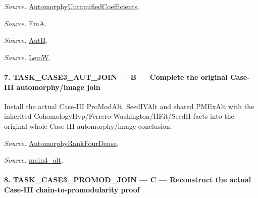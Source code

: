 \emph{Source.} \href{https://github.com/CocoSgt/riemann-hypothesis-lean/blob/7cbf7a0c32fca1badf05931879a37c3f8a2b03b4/src/Development/AutomorphicArithmetic/AutomorphicVarieties/AutomorphicCases/AutomorphyUnramifiedCoefficients.lean#L24-L27}{AutomorphyUnramifiedCoefficients}.

\emph{Source.} \href{https://github.com/CocoSgt/riemann-hypothesis-lean/blob/7cbf7a0c32fca1badf05931879a37c3f8a2b03b4/src/Development/AutomorphicArithmetic/AutomorphicVarieties/AutomorphicCases/AutomorphyUnramifiedCoefficients.lean#L12-L13}{FinA}.

\emph{Source.} \href{https://github.com/CocoSgt/riemann-hypothesis-lean/blob/7cbf7a0c32fca1badf05931879a37c3f8a2b03b4/src/Development/AutomorphicArithmetic/AutomorphicVarieties/AutomorphicCases/AutomorphyUnramifiedCoefficients.lean#L15-L17}{AutB}.

\emph{Source.} \href{https://github.com/CocoSgt/riemann-hypothesis-lean/blob/7cbf7a0c32fca1badf05931879a37c3f8a2b03b4/src/Development/AutomorphicArithmetic/AutomorphicVarieties/AutomorphicCases/AutomorphyUnramifiedCoefficients.lean#L19-L22}{LemW}.



\paragraph{7. TASK\_\allowbreak CASE3\_\allowbreak AUT\_\allowbreak JOIN — B — Complete the original Case-III automorphy/image join}

Install the actual Case-III ProModAlt, SeedIVAlt and shared PMExAlt with the inherited CohomologyHyp/Ferrero-Washington/HFit/SeedII facts into the original whole Case-III automorphy/image conclusion.

\emph{Source.} \href{https://github.com/CocoSgt/riemann-hypothesis-lean/blob/7cbf7a0c32fca1badf05931879a37c3f8a2b03b4/src/Development/AutomorphicArithmetic/AutomorphicVarieties/ModularityArgument/ThresholdArguments/DenseThresholdCases/PromodularityCaseThree.lean#L43-L44}{AutomorphyRankFourDense}.

\emph{Source.} \href{https://github.com/CocoSgt/riemann-hypothesis-lean/blob/7cbf7a0c32fca1badf05931879a37c3f8a2b03b4/src/Development/AutomorphicArithmetic/AutomorphicVarieties/ModularityArgument/ThresholdArguments/DenseThresholdCases/CuFinal.lean#L44-L44}{main4\_\allowbreak alt}.



\paragraph{8. TASK\_\allowbreak CASE3\_\allowbreak PROMOD\_\allowbreak JOIN — C — Reconstruct the actual Case-III chain-to-promodularity proof}

